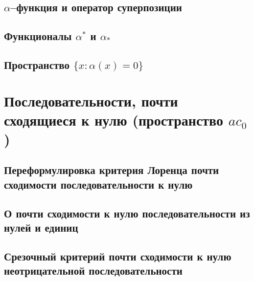 \documentclass[a4paper,openbib]{report}
\theoremstyle{definition}
\begin{document}
	\section{$\alpha$--функция и оператор суперпозиции}
	

	\section{Функционалы $\alpha^*$ и $\alpha_*$}
	

	\section{Пространство $\{x: \alpha(x) = 0\}$}
	


\chapter{Последовательности, почти сходящиеся к нулю (пространство $ac_0$)}

	\section{Переформулировка критерия Лоренца почти сходимости последовательности к нулю}
	

	\section{О почти сходимости к нулю последовательности из нулей и единиц}
	



	\section{Срезочный критерий почти сходимости к нулю неотрицательной последовательности}
	
\end{document}
